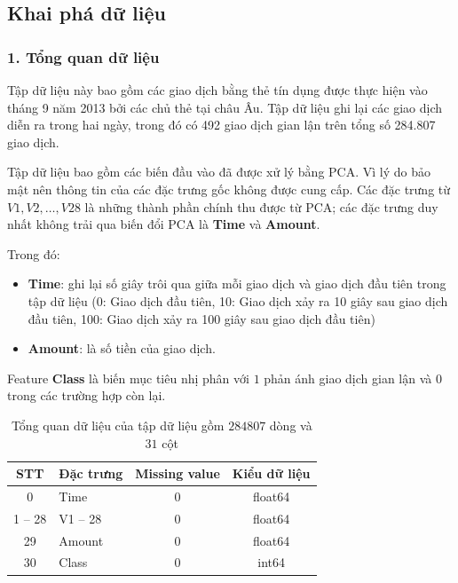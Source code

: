
\subsection{Khai phá dữ liệu}\label{subsec:eda}
\subsubsection*{1. Tổng quan dữ liệu}
Tập dữ liệu này bao gồm các giao dịch bằng thẻ tín dụng được thực hiện vào tháng 9 năm 2013 bởi các chủ thẻ tại châu Âu.
Tập dữ liệu ghi lại các giao dịch diễn ra trong hai ngày, trong đó có 492 giao dịch gian lận trên tổng số 284.807 giao dịch.

Tập dữ liệu bao gồm các biến đầu vào đã được xử lý bằng PCA. Vì lý do bảo mật nên thông tin của các đặc trưng gốc không được cung cấp. Các đặc trưng từ $V1, V2, …, V28$ là những thành phần chính thu được từ PCA; các đặc trưng duy nhất không trải qua biến đổi PCA là \textbf{Time} và \textbf{Amount}.

Trong đó:
\begin{itemize}
    \item \textbf{Time}: ghi lại số giây trôi qua giữa mỗi giao dịch và giao dịch đầu tiên trong tập dữ liệu (0: Giao dịch đầu tiên, 10: Giao dịch xảy ra 10 giây sau giao dịch đầu tiên, 100:  Giao dịch xảy ra 100 giây sau giao dịch đầu tiên)
    \item \textbf{Amount}: là số tiền của giao dịch.
\end{itemize}
  
Feature \textbf{Class} là biến mục tiêu nhị phân với $1$ phản ánh giao dịch gian lận và $0$ trong các trường hợp còn lại.

\begin{table}[H]
\centering
\caption{Tổng quan dữ liệu của tập dữ liệu gồm $284807$ dòng và $31$ cột}
    \begin{tabular}{|clcc|}
    \hline
    \textbf{STT} & \textbf{Đặc trưng} & \textbf{Missing value} & \textbf{Kiểu dữ liệu} \\ \hline
    0 & Time & 0 & float64 \\ \hline
    1 -- 28 & V1 -- 28 & 0 & float64 \\ \hline
    29 & Amount & 0 & float64 \\ \hline
    30 & Class & 0 & int64 \\ \hline
    \end{tabular}
\end{table}

